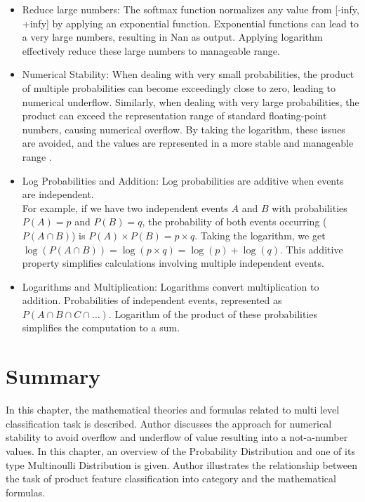 \begin{itemize}
    \item Reduce large numbers:  The softmax function normalizes any value from [-infy, +infy] by applying an exponential function. Exponential functions can lead to a very large numbers, resulting in  Nan as output. Applying logarithm effectively reduce these large numbers to manageable range.
    \item Numerical Stability: When dealing with very small probabilities, the product of multiple probabilities can become exceedingly close to zero, leading to numerical underflow. Similarly, when dealing with very large probabilities, the product can exceed the representation range of standard floating-point numbers, causing numerical overflow. By taking the logarithm, these issues are avoided, and the values are represented in a more stable and manageable range \parencite[Page 79]{Goodfellow-et-al-2016}.
    
    \item Log Probabilities and Addition: Log probabilities are additive when events are independent.\\ For example, if we have two independent events \(A\) and \(B\) with probabilities \(P(A) = p\) and \(P(B) = q\), the probability of both events occurring (\(P(A \cap B)\)) is \(P(A) \times P(B) = p \times q\). Taking the logarithm, we get \(\log(P(A \cap B)) = \log(p \times q) = \log(p) + \log(q)\). This additive property simplifies calculations involving multiple independent events.

    \item Logarithms and Multiplication: Logarithms convert multiplication to addition. Probabilities of independent events,  represented as \(P(A \cap B \cap C \cap \ldots)\). Logarithm of the product of these probabilities simplifies the computation to a sum. 
\end{itemize}


\section{Summary}

In this chapter, the mathematical theories and formulas related to multi level classification task is described. Author discusses the approach for numerical stability to avoid overflow and underflow of value resulting into a not-a-number values. In this chapter, an overview of the Probability Distribution and one of its type Multinoulli Distribution is given. Author illustrates the relationship between the task of product feature classification into category and the mathematical formulas.  